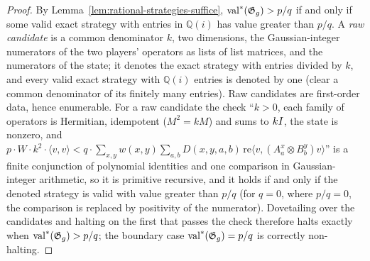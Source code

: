 \begin{proof}
\leanok
By Lemma~\ref{lem:rational-strategies-suffice}, $\mathrm{val}^*(\mathfrak{G}_g) > p/q$ if and only if
some valid exact strategy with entries in $\mathbb{Q}(i)$ has value greater than $p/q$.
A \emph{raw candidate} is a common denominator $k$, two dimensions, the Gaussian-integer
numerators of the two players' operators as lists of list matrices, and the numerators of
the state; it denotes the exact strategy with entries divided by $k$, and every valid exact
strategy with $\mathbb{Q}(i)$ entries is denoted by one (clear a common denominator of its
finitely many entries). Raw candidates are first-order data, hence enumerable. For a raw
candidate the check ``$k > 0$, each family of operators is Hermitian, idempotent
($M^2 = kM$) and sums to $kI$, the state is nonzero, and $p \cdot W \cdot k^2 \cdot
\langle v, v\rangle < q \cdot \sum_{x,y} w(x,y) \sum_{a,b} D(x,y,a,b)\, \mathrm{re}\langle v,
(A^x_a \otimes B^y_b) v\rangle$'' is a finite conjunction of polynomial identities and one
comparison in Gaussian-integer arithmetic, so it is primitive recursive, and it holds if
and only if the denoted strategy is valid with value greater than $p/q$ (for $q = 0$, where
$p/q = 0$, the comparison is replaced by positivity of the numerator). Dovetailing over the
candidates and halting on the first that passes the check therefore halts exactly when
$\mathrm{val}^*(\mathfrak{G}_g) > p/q$; the boundary case $\mathrm{val}^*(\mathfrak{G}_g) = p/q$ is correctly
non-halting.
\end{proof}

